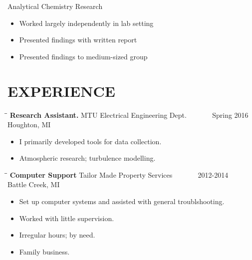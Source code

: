 \documentclass[letterpaper]{res}
\begin{document}
\begin{resume}
        Analytical Chemistry Research
        \begin{itemize} \itemsep1pt \parskip0pt 
                \item Worked largely independently in lab setting
                \item Presented findings with written report
                \item Presented findings to medium-sized group
        \end{itemize}

\section{EXPERIENCE}
   \vspace{-0.15in}
   \begin{tabbing}
   \hspace{2.3in}\= \hspace{2.6in}\= \kill %
   {\bf Research Assistant.} \>MTU Electrical Engineering Dept. \> ~~~~~~ Spring 2016\\
                          \>Houghton, MI
   \end{tabbing}\vspace{-10pt}
   \begin{itemize} \itemsep1pt \parskip0pt 
   \item I primarily developed tools for data collection.
   \item Atmospheric research; turbulence modelling.
   \end{itemize}

   \vspace{-0.15in}
   \begin{tabbing}
   \hspace{2.3in}\= \hspace{2.6in}\= \kill %
    {\bf Computer Support} \>Tailor Made Property Services \> ~~~~~~ 2012-2014\\
                          \>Battle Creek, MI
   \end{tabbing}\vspace{-10pt}
   \begin{itemize} \itemsep1pt \parskip0pt 
   \item Set up computer systems and assisted with general troublshooting.
   \item Worked with little supervision.
   \item Irregular hours; by need.
   \item Family business.
   \end{itemize}


\end{resume}
\end{document}
